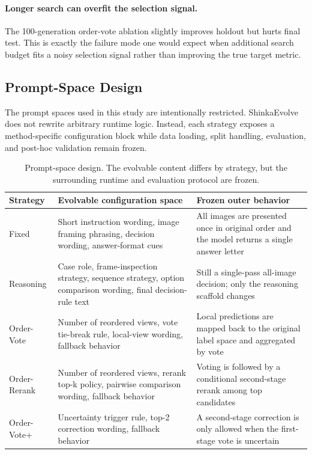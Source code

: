 \documentclass[11pt]{article}
\begin{document}
\paragraph{Longer search can overfit the selection signal.}
The 100-generation order-vote ablation slightly improves holdout but hurts final test. This is exactly the failure mode one would expect when additional search budget fits a noisy selection signal rather than improving the true target metric.

\subsection{Prompt-Space Design}

The prompt spaces used in this study are intentionally restricted. ShinkaEvolve does not rewrite arbitrary runtime logic. Instead, each strategy exposes a method-specific configuration block while data loading, split handling, evaluation, and post-hoc validation remain frozen.

\begin{table}[h]
\centering
\small
\begin{tabular}{p{1.7cm}p{5.2cm}p{7.0cm}}
\toprule
Strategy & Evolvable configuration space & Frozen outer behavior \\
\midrule
Fixed & Short instruction wording, image framing phrasing, decision wording, answer-format cues & All images are presented once in original order and the model returns a single answer letter \\
Reasoning & Case role, frame-inspection strategy, sequence strategy, option comparison wording, final decision-rule text & Still a single-pass all-image decision; only the reasoning scaffold changes \\
Order-Vote & Number of reordered views, vote tie-break rule, local-view wording, fallback behavior & Local predictions are mapped back to the original label space and aggregated by vote \\
Order-Rerank & Number of reordered views, rerank top-k policy, pairwise comparison wording, fallback behavior & Voting is followed by a conditional second-stage rerank among top candidates \\
Order-Vote+ & Uncertainty trigger rule, top-2 correction wording, fallback behavior & A second-stage correction is only allowed when the first-stage vote is uncertain \\
\bottomrule
\end{tabular}
\caption{Prompt-space design. The evolvable content differs by strategy, but the surrounding runtime and evaluation protocol are frozen.}
\label{tab:prompt-space}
\end{table}
\end{document}
